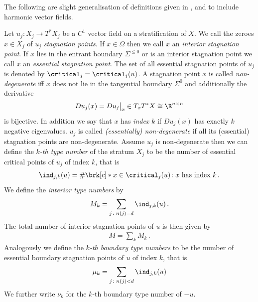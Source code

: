 The following are slight generalisation of definitions given in \cite[p.138f]{Shelton1980}, \cite[§5]{Morse1969} and \cite[p.282f]{Morse1970}
to include harmonic vector fields.
\begin{definition}\label{df:nonDegeneracy}
  Let $u_j\colon X_j\to T^*X_j$ be a $C^1$ vector field on a stratification of $X$.
  We call the zeroes $x\in X_j$ of $u_j$ \emph{stagnation points}.
  If $x\in\Omega$ then we call $x$ an \emph{interior stagnation point}.
  If $x$ lies in the entrant boundary $\Sigma^{\leq0}$ or is an interior stagnation point we call $x$ an \emph{essential stagnation point}.
  The set of all essential stagnation points of $u_j$ is denoted by $\critical_j=\critical_j(u)$.
  A stagnation point $x$ is called
  \emph{non-degenerate} iff $x$ does not lie in the tangential boundary $\Sigma^0$ 
  and additionally the derivative
  \begin{align*}
    Du_j(x)=Du_j\big\vert_x\in T_xT^*X\cong \R^{n\times n}
  \end{align*}
  is bijective.
  In addition we say that $x$ has \emph{index} $k$
  if $Du_j(x)$ has exactly $k$ negative eigenvalues.
  $u_j$ is called \emph{(essentially) non-degenerate} if all its (essential) stagnation points
  are non-degenerate. 
  Assume $u_j$ is non-degenerate then we can define the \emph{$k$-th type number} of the
  stratum $X_j$ to be the number of essential critical points of $u_j$ of index $k$,
  that is
  \begin{align*}
    \ind_{j,k}(u)=\#\brk[c]*{x\in\critical_j(u)\colon x\text{ has index }k}\,.
  \end{align*}
  We define the \emph{interior type numbers} by
  \begin{align*}
    M_k=\sum_{j\colon n(j)=d}\ind_{j,k}(u)\,.
  \end{align*}
  The total number of interior
  stagnation points of $u$ is then given by
  \begin{align*}
    M=\sum_kM_k\,.
  \end{align*}
  Analogously we define the \emph{$k$-th boundary type numbers} to be the number of essential boundary 
  stagnation points of $u$ of index $k$, that is
  \begin{align*}
    \mu_k=\sum_{j\colon n(j)<d}\ind_{j,k}(u)
  \end{align*}
  We further write $\nu_k$ for the $k$-th boundary type number of $-u$.
\end{definition}

